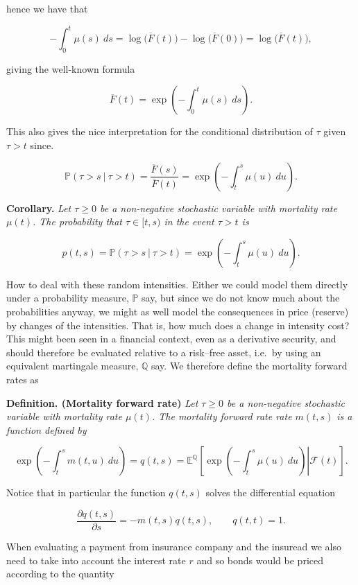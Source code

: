 \documentclass[a4paper,12pt,openany]{book}
\begin{document}
hence we have that

\[
-\int_0^t\mu(s)\ ds=\log\Big(\overline F(t)\Big)-\log\Big(\overline F(0)\Big)=\log\Big(\overline F(t)\Big),
\]

giving the well-known formula

\[
\overline F(t)=\exp\left(-\int_0^t\mu(s)\ ds\right).
\]

This also gives the nice interpretation for the conditional distribution of \(\tau\) given \(\tau>t\) since.

\[
\mathbb P(\tau > s\ \vert\ \tau > t)=\frac{\overline F(s)}{\overline F(t)}=\exp\left(-\int_t^s\mu(u)\ du\right).
\]

\textbf{Corollary.} \emph{Let \(\tau\ge 0\) be a non-negative stochastic variable with mortality rate \(\mu(t)\). The probability that \(\tau \in [t,s)\) in the event \(\tau >t\) is}

\[
p(t,s)=\mathbb P(\tau > s\ \vert\ \tau > t)=\exp\left(-\int_t^s\mu(u)\ du\right).
\]

How to deal with these random intensities. Either we could model them directly under a probability measure, \(\mathbb P\) say, but since we do not know much about the probabilities anyway, we might as well model the consequences in price (reserve) by changes of the intensities. That is, how much does a change in intensity cost? This might been seen in a financial context, even as a derivative security, and should therefore be evaluated relative to a risk--free asset, i.e.~by using an equivalent martingale measure, \(\mathbb Q\) say. We therefore define the mortality forward rates as

\textbf{Definition. (Mortality forward rate)} \emph{Let \(\tau\ge 0\) be a non-negative stochastic variable with mortality rate \(\mu(t)\). The mortality forward rate rate \(m(t,s)\) is a function defined by}

\[
\exp\left(-\int_t^s m(t,u)\ du\right)=q(t,s)=\mathbb E^{\mathbb Q}\left[\left. \exp\left(-\int_t^s\mu(u)\ du\right)\right\vert \mathcal F(t)\right].
\]

Notice that in particular the function \(q(t,s)\) solves the differential equation

\[
\frac{\partial q(t,s)}{\partial s}=-m(t,s)q(t,s),\qquad q(t,t)=1.
\]

When evaluating a payment from insurance company and the insuread we also need to take into account the interest rate \(r\) and so bonds would be priced according to the quantity
\end{document}
